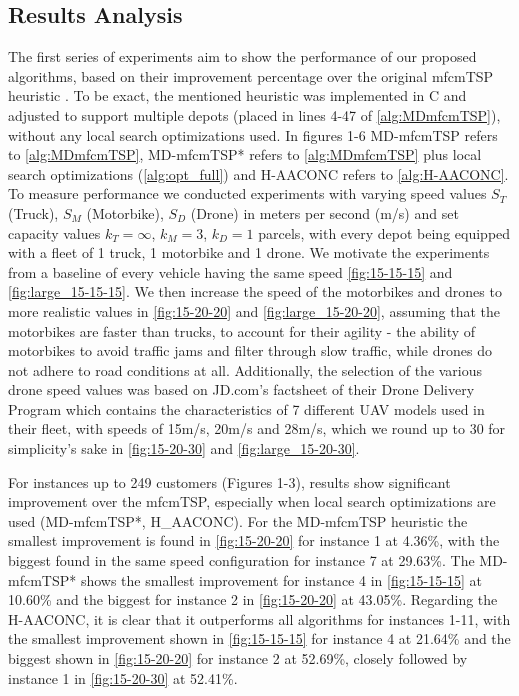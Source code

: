 \documentclass{article}
\begin{document}
	\subsection{Results Analysis}
	The first series of experiments aim to show the performance of our proposed algorithms, based on their improvement percentage over the original mfcmTSP heuristic \cite{Oikonomou2021}. To be exact, the mentioned heuristic was implemented in C and adjusted to support multiple depots (placed in lines 4-47 of \autoref{alg:MDmfcmTSP}), without any local search optimizations used. In figures 1-6 MD-mfcmTSP refers to \autoref{alg:MDmfcmTSP}, MD-mfcmTSP* refers to \autoref{alg:MDmfcmTSP} plus local search optimizations (\autoref{alg:opt_full}) and H-AACONC refers to \autoref{alg:H-AACONC}. To measure performance we conducted experiments with varying speed values $S_T$ (Truck), $S_M$ (Motorbike), $S_D$ (Drone) in meters per second (m/s) and set capacity values $k_T=\infty$, $k_M=3$, $k_D=1$ parcels, with every depot being equipped with a fleet of 1 truck, 1 motorbike and 1 drone. We motivate the experiments from a baseline of every vehicle having the same speed \autoref{fig:15-15-15} and \autoref{fig:large_15-15-15}. 
	We then increase the speed of the motorbikes and drones to more realistic values in \autoref{fig:15-20-20} and \autoref{fig:large_15-20-20}, assuming that the motorbikes are faster than trucks, to account for their agility - the ability of motorbikes to avoid traffic jams and filter through slow traffic, while drones do not adhere to road conditions at all. Additionally, the selection of the various drone speed values was based on JD.com's factsheet of their Drone Delivery Program \autocite{JDcom} which contains the characteristics of 7 different UAV models used in their fleet, with speeds of 15m/s, 20m/s and 28m/s, which we round up to 30 for simplicity's sake in \autoref{fig:15-20-30} and \autoref{fig:large_15-20-30}.
	\par 
	For instances up to 249 customers (Figures 1-3), results show significant improvement over the mfcmTSP, especially when local search optimizations are used (MD-mfcmTSP*, H\_AACONC). For the MD-mfcmTSP heuristic the smallest improvement is found in \autoref{fig:15-20-20} for instance 1 at 4.36\%, with the biggest found in the same speed configuration for instance 7 at 29.63\%. The MD-mfcmTSP* shows the smallest improvement for instance 4 in \autoref{fig:15-15-15} at 10.60\% and the biggest for instance 2 in \autoref{fig:15-20-20} at 43.05\%. Regarding the H-AACONC, it is clear that it outperforms all algorithms for instances 1-11, with the smallest improvement shown in \autoref{fig:15-15-15} for instance 4 at 21.64\% and the biggest shown in \autoref{fig:15-20-20} for instance 2 at 52.69\%, closely followed by instance 1 in \autoref{fig:15-20-30} at 52.41\%.
\end{document}
